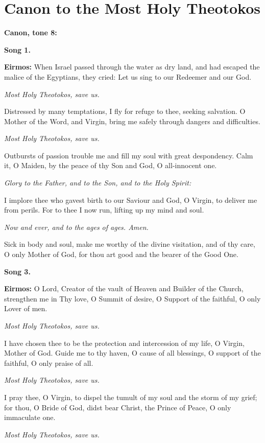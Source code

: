 \chapter{Canon to the Most Holy Theotokos}

\textbf{Canon, tone 8:}

\textbf{Song 1.}

\textbf{Eirmos:} 
When Israel passed through the water as dry land, and had escaped the malice of the Egyptians, they cried: 
Let us sing to our Redeemer and our God.

\emph{Most Holy Theotokos, save us.}

Distressed by many temptations, I fly for refuge to thee, seeking salvation. 
O Mother of the Word, and Virgin, bring me safely through dangers and difficulties.

\emph{Most Holy Theotokos, save us.}

Outbursts of passion trouble me and fill my soul with great despondency.
Calm it, O Maiden, by the peace of thy Son and God, O all-innocent one.

\emph{Glory to the Father, and to the Son, and to the Holy Spirit:}

I implore thee who gavest birth to our Saviour and God, O Virgin, to deliver me from perils. 
For to thee I now run, lifting up my mind and soul.

\emph{Now and ever, and to the ages of ages. Amen.}

Sick in body and soul, make me worthy of the divine visitation, and of thy care, O only Mother of God, for thou art good and the bearer of the Good One.

\textbf{Song 3.}

\textbf{Eirmos:} O Lord, Creator of the vault of Heaven and Builder of the Church, strengthen me in Thy love, O Summit of desire, O Support of the faithful, O only Lover of men.

\emph{Most Holy Theotokos, save us.}

I have chosen thee to be the protection and intercession of my life, O Virgin, Mother of God. Guide me to thy haven, O cause of all blessings, O support of the faithful, O only praise of all.

\emph{Most Holy Theotokos, save us.}

I pray thee, O Virgin, to dispel the tumult of my soul and the storm of my grief; 
for thou, O Bride of God, didst bear Christ, the Prince of Peace, O only immaculate one.

\emph{Most Holy Theotokos, save us.}

